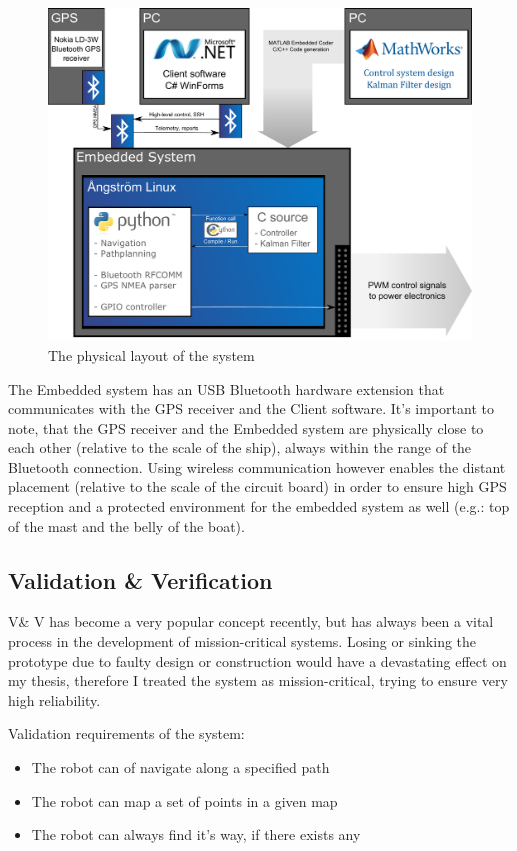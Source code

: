 \begin{figure}[H]
	\centering
	\includegraphics[width=1\textwidth]{img2/PhysicalLayout}
	\caption{The physical layout of the system}
	\label{fig:PhysicalLayout}
\end{figure}

The Embedded system has an USB Bluetooth hardware extension that communicates with the GPS receiver and the Client software.
It’s important to note, that the GPS receiver and the Embedded system are physically close to each other (relative to the scale of the ship), always within the range of the Bluetooth connection. Using wireless communication however enables the distant placement (relative to the scale of the circuit board) in order to ensure high GPS reception and a protected environment for the embedded system as well (e.g.: top of the mast and the belly of the boat).

\subsection{Validation \& Verification}

V\& V has become a very popular concept recently, but has always been a vital process in the development of mission-critical systems. Losing or sinking the prototype due to faulty design or construction would have a devastating effect on my thesis, therefore I treated the system as mission-critical, trying to ensure very high reliability.

Validation requirements of the system:

\begin{itemize}

\item The robot can of navigate along a specified path
\item The robot can map a set of points in a given map
\item The robot can always find it’s way, if there exists any

\end{itemize}

